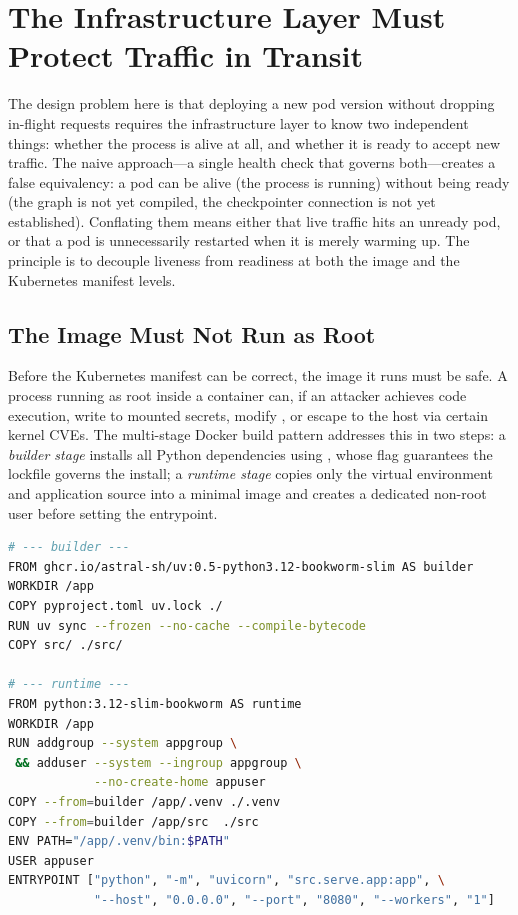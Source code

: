 \section{The Infrastructure Layer Must Protect Traffic in Transit}
\label{sec:infra-layer}

The design problem here is that deploying a new pod version without
dropping in-flight requests requires the infrastructure layer to know two
independent things: whether the process is alive at all, and whether it is
ready to accept new traffic. The naive approach---a single health check
that governs both---creates a false equivalency: a pod can be alive (the
process is running) without being ready (the graph is not yet compiled, the
checkpointer connection is not yet established). Conflating them means either
that live traffic hits an unready pod, or that a pod is unnecessarily
restarted when it is merely warming up. The principle is to decouple
liveness from readiness at both the image and the Kubernetes manifest levels.

\subsection*{The Image Must Not Run as Root}

Before the Kubernetes manifest can be correct, the image it runs must be
safe. A process running as root inside a container can, if an attacker
achieves code execution, write to mounted secrets, modify ,
or escape to the host via certain kernel CVEs. The multi-stage Docker build
pattern addresses this in two steps: a \emph{builder stage} installs all
Python dependencies using , whose  flag guarantees
the lockfile governs the install; a \emph{runtime stage} copies only the
virtual environment and application source into a minimal image and creates a
dedicated non-root user before setting the entrypoint.

\begin{lstlisting}[language=bash,
  caption={Multi-stage Dockerfile with non-root runtime --- \texttt{Dockerfile}},
  label={lst:dockerfile}]
# --- builder ---
FROM ghcr.io/astral-sh/uv:0.5-python3.12-bookworm-slim AS builder
WORKDIR /app
COPY pyproject.toml uv.lock ./
RUN uv sync --frozen --no-cache --compile-bytecode
COPY src/ ./src/

# --- runtime ---
FROM python:3.12-slim-bookworm AS runtime
WORKDIR /app
RUN addgroup --system appgroup \
 && adduser --system --ingroup appgroup \
            --no-create-home appuser
COPY --from=builder /app/.venv ./.venv
COPY --from=builder /app/src  ./src
ENV PATH="/app/.venv/bin:$PATH"
USER appuser
ENTRYPOINT ["python", "-m", "uvicorn", "src.serve.app:app", \
            "--host", "0.0.0.0", "--port", "8080", "--workers", "1"]
\end{lstlisting}

